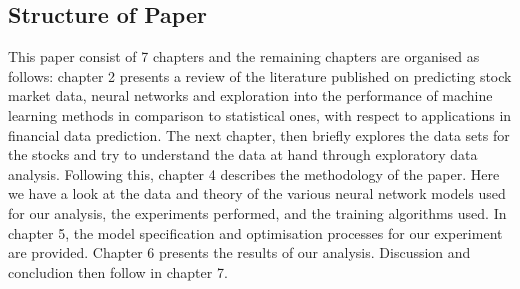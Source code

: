 \subsection{Structure of Paper}

This paper consist of 7 chapters and the remaining chapters are organised as follows: chapter 2 presents a review of the literature published on predicting stock market data, neural networks and exploration into the performance of machine learning methods in comparison to statistical ones, with respect to applications in financial data prediction. The next chapter, then briefly explores the data sets for the stocks and try to understand the data at hand through exploratory data analysis. Following this, chapter 4 describes the methodology of the paper. Here we have a look at the data and theory of the various neural network models used for our analysis, the experiments performed, and the training algorithms used. In chapter 5, the model specification and optimisation processes for our experiment are provided. Chapter 6 presents the results of our analysis. Discussion and concludion then follow in chapter 7. 






